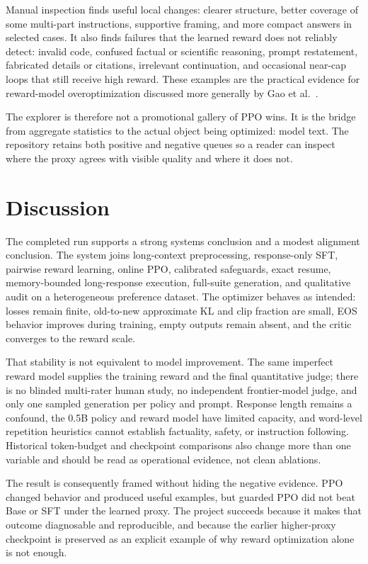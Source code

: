 \documentclass[11pt]{article}
\begin{document}
Manual inspection finds useful local changes: clearer structure, better
coverage of some multi-part instructions, supportive framing, and more compact
answers in selected cases. It also finds failures that the learned reward does
not reliably detect: invalid code, confused factual or scientific reasoning,
prompt restatement, fabricated details or citations, irrelevant continuation,
and occasional near-cap loops that still receive high reward. These examples
are the practical evidence for reward-model overoptimization discussed more
generally by Gao et al.\ \cite{gao2023}.

The explorer is therefore not a promotional gallery of PPO wins. It is the
bridge from aggregate statistics to the actual object being optimized: model
text. The repository retains both positive and negative queues so a reader can
inspect where the proxy agrees with visible quality and where it does not.

\section{Discussion}

The completed run supports a strong systems conclusion and a modest alignment
conclusion. The system joins long-context preprocessing, response-only SFT,
pairwise reward learning, online PPO, calibrated safeguards, exact resume,
memory-bounded long-response execution, full-suite generation, and qualitative
audit on a heterogeneous preference dataset. The optimizer behaves as intended:
losses remain finite, old-to-new approximate KL and clip fraction are small,
EOS behavior improves during training, empty outputs remain absent, and the
critic converges to the reward scale.

That stability is not equivalent to model improvement. The same imperfect
reward model supplies the training reward and the final quantitative judge;
there is no blinded multi-rater human study, no independent frontier-model
judge, and only one sampled generation per policy and prompt. Response length
remains a confound, the 0.5B policy and reward model have limited capacity, and
word-level repetition heuristics cannot establish factuality, safety, or
instruction following. Historical token-budget and checkpoint comparisons also
change more than one variable and should be read as operational evidence, not
clean ablations.

The result is consequently framed without hiding the negative evidence. PPO
changed behavior and produced useful examples, but guarded PPO did not beat
Base or SFT under the learned proxy. The project succeeds because it makes
that outcome diagnosable and reproducible, and because the earlier higher-proxy
checkpoint is preserved as an explicit example of why reward optimization alone
is not enough.
\end{document}
